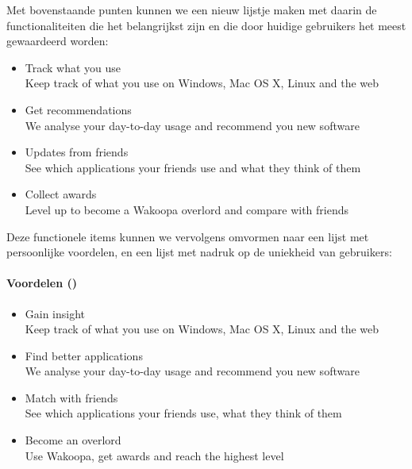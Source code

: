 Met bovenstaande punten kunnen we een nieuw lijstje maken met daarin de functionaliteiten die het belangrijkst zijn en die door huidige gebruikers het meest gewaardeerd worden:
\begin{itemize}
    \item{Track what you use\\
      Keep track of what you use on Windows, Mac OS X, Linux and the web}

    \item{Get recommendations\\
      We analyse your day-to-day usage and recommend you new software}

    \item{Updates from friends\\
      See which applications your friends use and what they think of them}

    \item{Collect awards\\
      Level up to become a Wakoopa overlord and compare with friends}
\end{itemize}

Deze functionele items kunnen we vervolgens omvormen naar een lijst met persoonlijke voordelen, en een lijst met nadruk op de uniekheid van gebruikers:

\paragraph{Voordelen (\citet{Hoekman2008}) }
\begin{itemize}
    \item{Gain insight\\
      Keep track of what you use on Windows, Mac OS X, Linux and the web}

    \item{Find better applications\\
      We analyse your day-to-day usage and recommend you new software}

    \item{Match with friends\\
      See which applications your friends use, what they think of them}

    \item{Become an overlord\\
      Use Wakoopa, get awards and reach the highest level}
\end{itemize}
